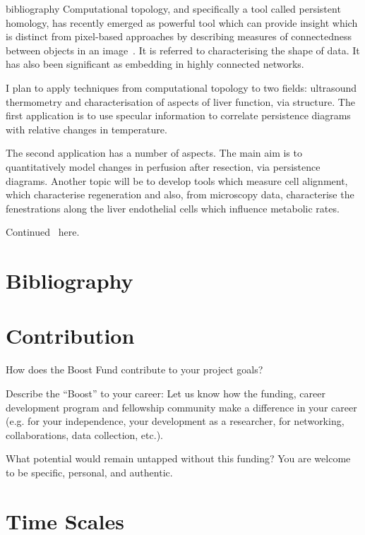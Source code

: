 \begin{btUnit}
\begin{btSect}{bibliography}
Computational topology, and specifically a tool called persistent homology, has recently emerged as powerful tool which can provide insight which is distinct from pixel-based approaches by describing measures of connectedness between objects in an image~. It is referred to characterising the shape of data.  It has also been significant as embedding in highly connected networks. 

I plan to apply techniques from computational topology to two fields: \textcolor{custom}{ultrasound thermometry} and \textcolor{custom}{characterisation of aspects of liver function}, via structure. The first application is to use specular information to correlate persistence diagrams with relative changes in temperature. 

The second application has a number of aspects. The main aim is to quantitatively model changes in perfusion after resection, via persistence diagrams. Another topic will be to develop tools which measure cell alignment, which characterise regeneration and also, from microscopy data, characterise the fenestrations along the liver endothelial cells which influence metabolic rates.

\newpage
Continued~\cite{ravishankar2023sonosamtrack} here.

\newpage
\section{Bibliography}

\btPrintCited 

\end{btSect} 
\end{btUnit} 


\newpage
\section{Contribution}

How does the Boost Fund contribute to your project goals?  

Describe the \enquote{Boost} to your career: Let us know how the funding, career development program and fellowship community make a difference in your career (e.g. for your independence, your development as a researcher, for networking, collaborations, data collection, etc.).  

What potential would remain untapped without this funding? You are welcome to be specific, personal, and authentic. 


\newpage
\section{Time Scales}

